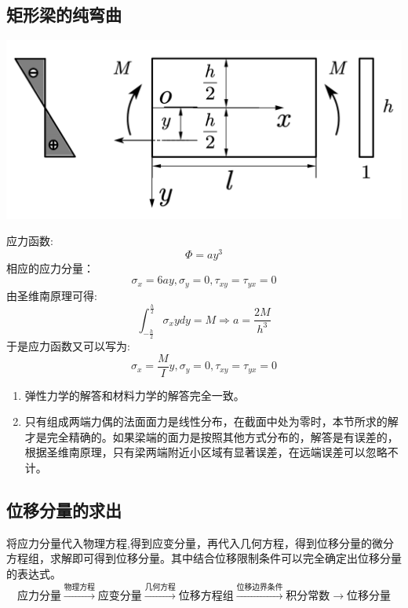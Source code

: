\subsection{矩形梁的纯弯曲}
\centerline{\includegraphics[scale=0.6]{figure/3-3.png}}
应力函数:\[\varPhi =ay^3\]
相应的应力分量：\[\sigma _x=6ay,\sigma _y=0,\tau _{xy}=\tau _{yx}=0\]
由圣维南原理可得:\[\int_{-\frac{h}{2}}^{\frac{h}{2}}{\sigma _xydy}=M\Longrightarrow a=\frac{2M}{h^3}\]
于是应力函数又可以写为:\[\sigma _x=\frac{M}{I}y,\sigma _y=0,\tau _{xy}=\tau _{yx}=0\]
\begin{enumerate}
	\item 弹性力学的解答和材料力学的解答完全一致。
	\item 只有组成两端力偶的法面面力是线性分布，在截面中处为零时，本节所求的解才是完全精确的。如果梁端的面力是按照其他方式分布的，解答是有误差的，根据圣维南原理，只有梁两端附近小区域有显著误差，在远端误差可以忽略不计。
\end{enumerate}
\subsection{位移分量的求出}
将应力分量代入物理方程,得到应变分量，再代入几何方程，得到位移分量的微分方程组，求解即可得到位移分量。其中结合位移限制条件可以完全确定出位移分量的表达式。
\[\text{应力分量}\xrightarrow{\text{物理方程}}\text{应变分量}\xrightarrow{\text{几何方程}}\text{位移方程组}\xrightarrow{\text{位移边界条件}}\text{积分常数}\longrightarrow \text{位移分量}\]
